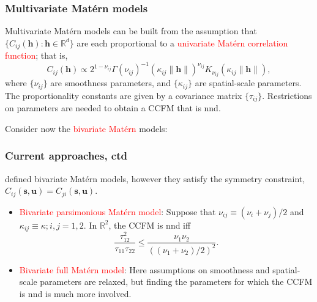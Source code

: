 \documentclass{beamer}
\newcommand{\s}{\mathbf{s}}
\renewcommand{\u}{\mathbf{u}}
\begin{document}

\begin{frame}
\frametitle{Multivariate Mat\'{e}rn models}
Multivariate Mat\'{e}rn models can be built from the assumption that $\{C_{ij}(\mathbf{h}):\mathbf{h}\in\mathbb{R}^d\}$ are each proportional to a \textcolor{red}{univariate Mat\'{e}rn correlation function}; that is,
$$
C_{ij}(\mathbf{h})\propto 2^{1-\nu_{ij}}\Gamma(\nu_{ij})^{-1}(\kappa_{ij}\|\mathbf{h}\|)^{\nu_{ij}}K_{\nu_{ij}}(\kappa_{ij}\|\mathbf{h}\|),
$$
where $\{\nu_{ij}\}$ are smoothness parameters, and $\{\kappa_{ij}\}$ are spatial-scale parameters. The proportionality constants are given by a covariance matrix $\{\tau_{ij}\}$. Restrictions on parameters are needed to obtain a CCFM that is nnd. 

Consider now the \textcolor{red}{bivariate Mat\'{e}rn} models:
\vfill
\end{frame}

\begin{frame}
\frametitle{Current approaches, ctd}
\cite{Gneitingetal2010} defined bivariate Mat\'{e}rn models, however they satisfy the symmetry constraint, $C_{ij}(\s,\u)=C_{ji}(\s,\u)$.
\begin{itemize}
\item \textcolor{red}{Bivariate parsimonious Matérn model}: Suppose that $\nu_{ij}\equiv(\nu_i+\nu_j)/2$ and $\kappa_{ij}\equiv\kappa;i,j=1,2$. In $\mathbb{R}^2$, the CCFM is nnd iff
$$
\frac{\tau_{12}^2}{\tau_{11}\tau_{22}}\leq\frac{\nu_1\nu_2}{((\nu_1+\nu_2)/2)^2}.
$$



\item \textcolor{red}{Bivariate full Matérn model}:  Here assumptions on smoothness and spatial-scale parameters are relaxed, but finding the parameters for which the CCFM is nnd is much more involved.\vfill
\end{itemize}
\vfill
\end{frame}
\end{document}
